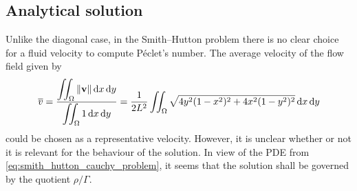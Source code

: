 
\subsection{Analytical solution}

Unlike the diagonal case, in the Smith--Hutton problem there is no clear choice
for a fluid velocity to compute Péclet's number. The average velocity of the
flow field given by
\begin{equation*}
	\overline{v} = 
	\dfrac{\displaystyle \iint_\Omega \norm{\vb{v}} \dd{x} \dd{y}}{\displaystyle \iint_\Omega 1 \dd{x} \dd{y}} = 
	\frac{1}{2 L^2}
	\iint_\Omega \sqrt{4 y^2 (1 - x^2)^2 + 4 x^2 (1 - y^2)^2} \dd{x} \dd{y}
\end{equation*}
could be chosen as a representative velocity. However, it is unclear whether or
not it is relevant for the behaviour of the solution. In view of the PDE from
\eqref{eq:smith_hutton_cauchy_problem}, it seems that the solution shall be
governed by the quotient $\rho / \Gamma$.



